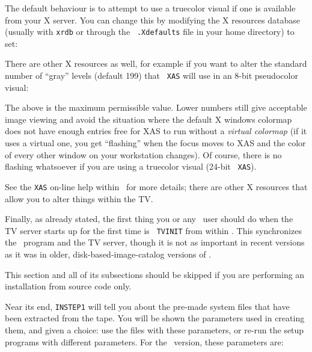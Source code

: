 The default behaviour is to attempt to use a truecolor visual if one is
available from your X server.  You can change this by modifying the X
resources database (usually with {\tt xrdb} or through the {\tt
.Xdefaults} file in your home directory) to set:\medskip

\medskip

\noindent There are other X resources as well, for example if you want
to alter the standard number of ``gray'' levels (default 199) that {\tt
XAS} will use in an 8-bit  pseudocolor visual:\medskip


\noindent The above is the maximum permissible value.  Lower numbers
still give acceptable image viewing and avoid the situation where the
default X windows colormap does not have enough entries free for XAS to
run without a {\it virtual colormap\/} (if it uses a virtual one, you
get ``flashing'' when the focus moves to XAS and the color of every
other window on your workstation changes).  Of course, there is no
flashing whatsoever if you are using a truecolor visual (24-bit {\tt
XAS}).

See the {\tt XAS} on-line help within \ttaips\ for more details; there
are other X resources that allow you to alter things within the TV.

Finally, as already stated, the first thing you or any \ttaips\ user
should do when the TV server starts up for the first time is {\tt
TVINIT} from within \ttaips.  This synchronizes the \ttaips\ program and
the TV server, though it is not as important in recent versions as it
was in older, disk-based-image-catalog versions of \AIPS.

\medskip{}

This section and all of its subsections should be skipped if you are
performing an installation from source code only.

\medskip{}

Near its end, {\tt INSTEP1} will tell you about the pre-made system
files that have been extracted from the tape.  You will be shown the
parameters used in creating them, and given a choice: use the files with
these parameters, or re-run the setup programs with different
parameters.  For the \THISVER\ version, these parameters are: \medskip

\medskip

